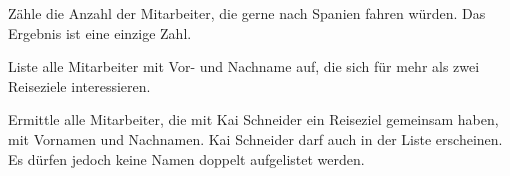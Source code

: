 \begin{compactenum}[a)]
\begin{compactenum}[1.]
\item Zähle die Anzahl der Mitarbeiter, die gerne nach Spanien fahren würden.
Das Ergebnis ist eine einzige Zahl.

\item Liste alle Mitarbeiter mit Vor- und Nachname auf, die sich für mehr als
zwei Reiseziele interessieren.

\item Ermittle alle Mitarbeiter, die mit Kai Schneider ein Reiseziel gemeinsam
haben, mit Vornamen und Nachnamen. Kai Schneider darf auch in der Liste
erscheinen. Es dürfen jedoch keine Namen doppelt aufgelistet werden.
\end{compactenum}
\end{compactenum}